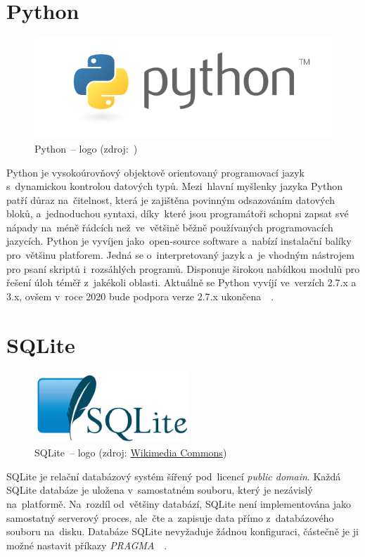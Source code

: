 \section{Python}
\label{python}

	\begin{figure}[H] \centering
		\includegraphics[width=.5\textwidth]{./pictures/python_logo.png}
      	\caption[Python~– logo]{Python~– logo (zdroj:~\citep{python})}
		\label{fig:python_logo}
 	\end{figure}

Python je vysokoúrovňový objektově orientovaný programovací jazyk
s~dynamickou kontrolou datových typů. Mezi~hlavní myšlenky jazyka
Python patří důraz na~čitelnost, která je zajištěna povinným
odsazováním datových bloků, a~jednoduchou syntaxi, díky~které jsou
programátoři schopni zapsat své nápady na~méně řádcích než~ve~většině
běžně používaných programovacích jazycích. Python je vyvíjen
jako~open-source software a~nabízí instalační balíky pro~většinu
platforem. Jedná se o~interpretovaný jazyk a~je vhodným nástrojem pro
psaní skriptů i~rozsáhlých programů. Disponuje širokou nabídkou modulů
pro řešení úloh téměř z~jakékoli oblasti. Aktuálně se Python vyvíjí
ve~verzích 2.7.x a 3.x, ovšem v~roce 2020 bude podpora verze 2.7.x
ukončena~\citep{python}~\citep{wiki_python}.

\section{SQLite}
\label{sqlite}

	\begin{figure}[H] \centering
		\includegraphics[width=.2\textwidth]{./pictures/sqlite_logo.png}
      	\caption[SQLite~– logo]{SQLite~– logo (zdroj:
\href{https://commons.wikimedia.org/wiki/File:SQLite_Logo_4.png}{Wikimedia
Commons})}
		\label{fig:sqlite_logo}
 	\end{figure}

SQLite je relační databázový systém šířený pod~licencí \textit{public
domain}. Každá SQLite databáze je uložena v~samostatném souboru, který
je nezávislý na~platformě. Na~rozdíl od~většiny databází, SQLite není
implementována jako samostatný serverový proces, ale~čte a~zapisuje
data přímo z~databázového souboru na~disku. Databáze SQLite nevyžaduje
žádnou konfiguraci, částečně je ji možné nastavit příkazy
\textit{PRAGMA}~\citep{sqlite}~\citep{wiki_sqlite}.

